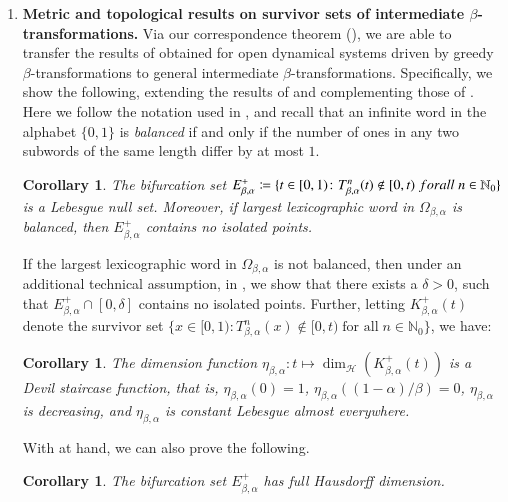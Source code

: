 \documentclass[a4paper,reqno,10pt]{amsart}
\newtheorem{corollary}[theorem]{Corollary}
\begin{document}
\begin{enumerate}[label={\rm(\arabic*)},leftmargin=*]
\begin{corollary}
\begin{enumerate}[label={\rm(\roman*)}]
                    \end{enumerate}
            \end{corollary}
        \noindent These results together with the results of \cite{LSSS} complements the corresponding result for the case when $\alpha = 0$ proven in \cite{P1960} and which asserts that any greedy $\beta$-shift can be approximated from \textsl{above} and \textsl{below} by a greedy $\beta$-shift of finite type.
        \vspace{1em}
        \item {\bfseries Metric and topological results on survivor sets of intermediate \mbox{$\beta$-transformations}.} Via our correspondence theorem (), we are able to transfer the results of \cite{KKLL} obtained for open dynamical systems driven by greedy $\beta$-transformations to general intermediate $\beta$-transformations.  Specifically, we show the following, extending the results of \cite{KKLL} and complementing those of \cite{Ur86,N09}. Here we follow the notation used in \cite{KKLL}, and recall  that an infinite word in the alphabet $\{0, 1\}$ is \textsl{balanced} if and only if the number of ones in any two subwords of the same length differ by at most $1$.
            \begin{corollary}\label{Cor_2}
            The bifurcation set $E_{\beta,\alpha}^{+} \coloneqq \{ t \in[0,1) \colon T_{\beta, \alpha}^{n}(t) \not\in [0, t) \; \textup{for all} \; n \in \mathbb{N}_{0} \}$ is a Lebesgue null set. Moreover, if largest lexicographic word in $\Omega_{\beta, \alpha}$ is balanced, then $E_{\beta,\alpha}^{+}$ contains no isolated points.
            \end{corollary}
        \noindent If the largest lexicographic word in $\Omega_{\beta, \alpha}$ is not balanced, then under an additional technical assumption, in , we show that there exists a $\delta > 0$, such that $E_{\beta,\alpha}^{+} \cap [0, \delta]$ contains no isolated points. Further, letting  $K^{+}_{\beta, \alpha}(t)$ denote the survivor set $\{ x \in[0,1) \colon T_{\beta,\alpha}^{n}(x)\not \in [0,t) \; \text{for all} \; n \in \mathbb{N}_{0} \}$, we have:
            \begin{corollary}\label{Cor_3}
            The dimension function $\eta_{\beta, \alpha} \colon t \mapsto \dim_{\mathcal{H}}(K_{\beta,\alpha}^{+}(t))$ is a Devil staircase function, that is, $\eta_{\beta,\alpha}(0) = 1$, $\eta_{\beta,\alpha}((1-\alpha)/\beta) = 0$, $\eta_{\beta, \alpha}$ is decreasing, and $\eta_{\beta,\alpha}$ is constant Lebesgue almost everywhere.
            \end{corollary}
        \noindent With  at hand, we can also prove the following.
            \begin{corollary}\label{Cor_E_beta_alpha}
                The bifurcation set $E_{\beta,\alpha}^{+}$ has full Hausdorff dimension.
            \end{corollary}
\end{enumerate}
\end{document}
